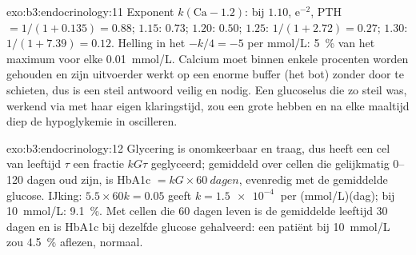 \begin{solution}{exo:b3:endocrinology:11}
Exponent $k(\text{Ca} - 1.2)$: bij $1.10$, $\mathrm{e}^{-2}$, PTH $= 1/
(1 + 0.135) = 0.88$; $1.15$: $0.73$; $1.20$: $0.50$; $1.25$: $1/(1 +
2.72) = 0.27$; $1.30$: $1/(1 + 7.39) = 0.12$. Helling in het 
$-k/4 = -5$ per mmol/L: \qty{5}{\%} van het maximum voor elke
\qty{0.01}{mmol/L}. Calcium moet binnen enkele procenten worden
gehouden en zijn uitvoerder werkt op een enorme buffer (het bot) zonder
door te schieten, dus is een steil antwoord veilig en nodig. Een
glucoselus die zo steil was, werkend via  met haar eigen
klaringstijd, zou een grote  hebben en na elke maaltijd
diep de hypoglykemie in oscilleren.
\end{solution}

\begin{solution}{exo:b3:endocrinology:12}
Glycering is onomkeerbaar en traag, dus heeft een cel van leeftijd
$\tau$ een fractie $kG\tau$ geglyceerd; gemiddeld over cellen die
gelijkmatig \numrange{0}{120} dagen oud zijn, is HbA1c
$= kG\times\qty{60}{dagen}$, evenredig met de gemiddelde glucose.
IJking: $5.5\times 60k = 0.05$ geeft $k =
\qty{1.5e-4}{}$ per (mmol/L)(dag); bij \qty{10}{mmol/L}: \qty{9.1}{\%}.
Met cellen die 60 dagen leven is de gemiddelde leeftijd 30 dagen en is
HbA1c bij dezelfde glucose gehalveerd: een patiënt bij
\qty{10}{mmol/L} zou \qty{4.5}{\%} aflezen, normaal.
\end{solution}

